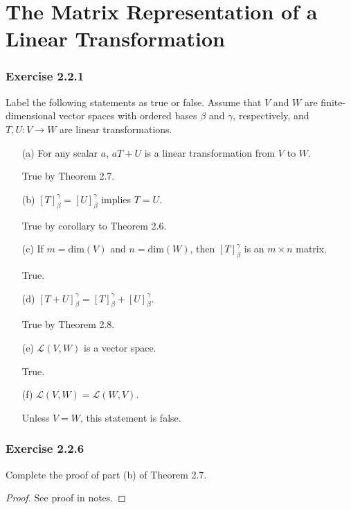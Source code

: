 \section{The Matrix Representation of a Linear Transformation}

\subsubsection{Exercise 2.2.1} Label the following statements as true or false. Assume that \( V  \) and \( W  \) are finite-dimensional vector spaces with ordered bases \( \beta \) and \( \gamma \), respectively, and \( T,U : V \to W  \) are linear transformations.
\begin{enumerate}
    \item[(a)] For any scalar \( a \), \( aT + U  \) is a linear transformation from \( V  \) to \( W  \). 
        \begin{solution}
        True by Theorem 2.7.
        \end{solution}
    \item[(b)] \( [T]_{\beta}^{\gamma}  = [U]_{\beta}^{\gamma}  \) implies \( T = U  \).
        \begin{solution}
        True by corollary to Theorem 2.6.
        \end{solution}
    \item[(c)] If \( m = \text{dim}(V) \) and \( n = \text{dim}(W) \), then \( [T]_{\beta}^{\gamma}  \) is an \( m \times n  \) matrix.
        \begin{solution}
         True.
        \end{solution}
    \item[(d)] \( [T+U]_{\beta}^{\gamma}  = [T]_{\beta}^{\gamma}  + [U]_{\beta}^{\gamma} . \) 
        \begin{solution}
        True by Theorem 2.8.
        \end{solution}
    \item[(e)] \( \mathcal{L}(V, W)  \) is a vector space.
        \begin{solution}
        True.
        \end{solution}
\item[(f)] \( \mathcal{L}(V,W) = \mathcal{L}(W,V) \).
        \begin{solution}
        Unless \( V = W  \), this statement is false.
        \end{solution}
\end{enumerate}

\subsubsection{Exercise 2.2.6} Complete the proof of part (b) of Theorem 2.7.
\begin{proof}
See proof in notes.
\end{proof}

